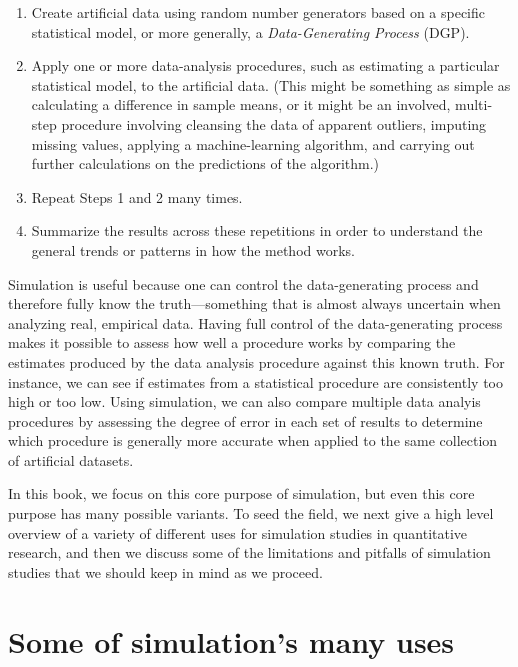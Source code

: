 \documentclass[
]{book}
\providecommand{\tightlist}{%
  \setlength{\itemsep}{0pt}\setlength{\parskip}{0pt}}
\begin{document}
\begin{enumerate}
\def\labelenumi{\arabic{enumi}.}
\tightlist
\item
  Create artificial data using random number generators based on a specific statistical model, or more generally, a \emph{Data-Generating Process} (DGP).
\item
  Apply one or more data-analysis procedures, such as estimating a particular statistical model, to the artificial data. (This might be something as simple as calculating a difference in sample means, or it might be an involved, multi-step procedure involving cleansing the data of apparent outliers, imputing missing values, applying a machine-learning algorithm, and carrying out further calculations on the predictions of the algorithm.)
\item
  Repeat Steps 1 and 2 many times.
\item
  Summarize the results across these repetitions in order to understand the general trends or patterns in how the method works.
\end{enumerate}

Simulation is useful because one can control the data-generating process and therefore fully know the truth---something that is almost always uncertain when analyzing real, empirical data.
Having full control of the data-generating process makes it possible to assess how well a procedure works by comparing the estimates produced by the data analysis procedure against this known truth.
For instance, we can see if estimates from a statistical procedure are consistently too high or too low.
Using simulation, we can also compare multiple data analyis procedures by assessing the degree of error in each set of results to determine which procedure is generally more accurate when applied to the same collection of artificial datasets.

In this book, we focus on this core purpose of simulation, but even this core purpose has many possible variants.
To seed the field, we next give a high level overview of a variety of different uses for simulation studies in quantitative research, and then we discuss some of the limitations and pitfalls of simulation studies that we should keep in mind as we proceed.

\section{Some of simulation's many uses}\label{some-of-simulations-many-uses}
\end{document}
